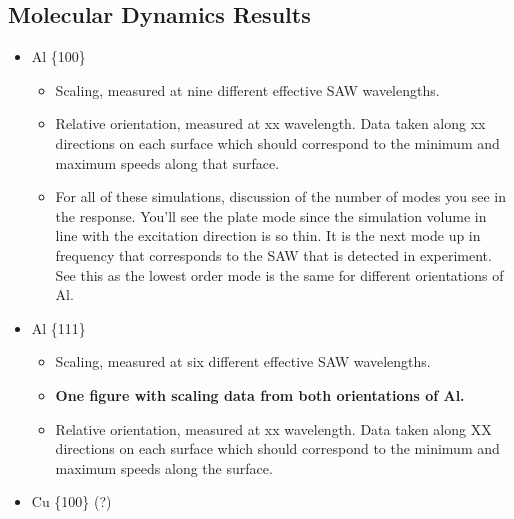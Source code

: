 \subsection{Molecular Dynamics Results}
\begin{itemize}
\item Al \{100\}
	\begin{itemize}
	\item Scaling, measured at nine different effective SAW wavelengths.
	\item Relative orientation, measured at xx wavelength. Data taken along xx directions on each surface which should correspond to the minimum and maximum speeds along that surface. 
	\item For all of these simulations, discussion of the number of modes you see in the response. You'll see the plate mode since the simulation volume in line with the excitation direction is so thin. It is the next mode up in frequency that corresponds to the SAW that is detected in experiment. See this as the lowest order mode is the same for different orientations of Al. 
	\end{itemize}
\item Al \{111\}
	\begin{itemize}
	\item Scaling, measured at six different effective SAW wavelengths.
	\item \textbf{One figure with scaling data from both orientations of Al.}
	\item Relative orientation, measured at xx wavelength. Data taken along XX directions on each surface which should correspond to the minimum and maximum speeds along the surface. 
	\end{itemize}
\item Cu \{100\} (?)
\end{itemize}
 






